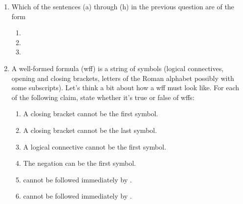 \begin{enumerate}
\begin{enumerate}
\item {}

\item {}


\end{enumerate}

\item Which of the sentences (a) through (h) in the previous question are of the 
 form

 \begin{enumerate}

  \item {} 

  \item {}

  \item {}

 \end{enumerate}


\item A well-formed formula (wff) is a string of symbols (logical connectives, 
 opening and closing brackets, letters of the Roman alphabet possibly with some 
 subscripts). Let's think a bit about how a wff must look like. For each of the 
 following claim, state whether it's true or false of wffs:

 \begin{enumerate}

  \item A closing bracket cannot be the first symbol.


  \item A closing bracket cannot be the last symbol.

  \item A logical connective cannot be the first symbol.


  \item The negation can be the first symbol.


  \item \p{\lnot} cannot be followed immediately by \p{\land}. 


  \item \p{\land} cannot be followed immediately by \p{\lnot}.




\end{enumerate}
\end{enumerate}
